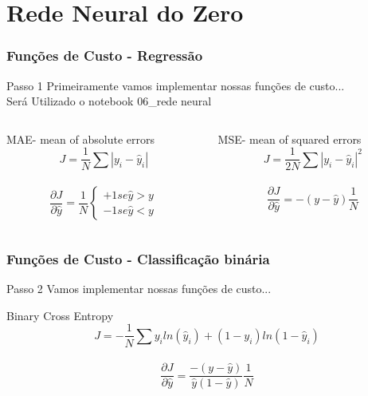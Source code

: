 \documentclass{beamer}
\begin{document}
\section{Rede Neural do Zero}

\begin{frame}
	\frametitle{Funções de Custo - Regressão}
	\begin{block}{Passo 1}
		Primeiramente vamos implementar nossas funções de custo... \\
		Será Utilizado o notebook 06\_rede neural
	\end{block}
	\begin{columns}
		\begin{column}{0.4\textwidth}
			\begin{block}{MAE- mean of absolute errors}
				$$J = \frac{1}{N} \sum |y_i - \hat{y}_i|$$ \\
				$$\frac{\partial J}{\partial \hat{y}} = \frac{1}{N} \left\{\begin{matrix}
					+1 se \hat{y} > y
					\\ 
					-1 se \hat{y} < y
				\end{matrix}\right.$$ 
			\end{block}
		\end{column}
		\begin{column}{0.4\textwidth}
			\begin{block}{MSE- mean of squared errors}
				$$J = \frac{1}{2N} \sum |y_i - \hat{y}_i|^2$$ \\
				$$\frac{\partial J}{\partial \hat{y}} = -(y-\hat{y})\frac{1}{N}$$ 
			\end{block}
		\end{column}
	\end{columns}
\end{frame}
\begin{frame}
	\frametitle{Funções de Custo - Classificação binária}
	\begin{block}{Passo 2}
		Vamos implementar nossas funções de custo... \\
	\end{block}
	\begin{block}{Binary Cross Entropy}
		$$J = -\frac{1}{N} \sum y_iln(\hat{y}_i)+(1-y_i)ln(1-\hat{y}_i)$$ \\
		$$\frac{\partial J}{\partial \hat{y}} = \frac{-(y-\hat{y})}{\hat{y}(1-\hat{y})}\frac{1}{N}$$ 
	\end{block}
\end{frame}
\end{document}
